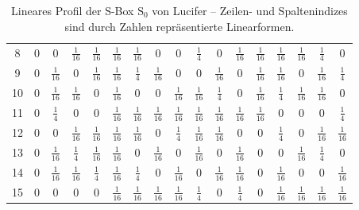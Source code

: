 \begin{refsegment}
\begin{table}
\begin{center}
\begin{tabular}{|c|cccccccccccccccc|}
 8&0& 0            &$\frac{1}{16}$&$\frac{1}{16}$&$\frac{1}{16}$&$\frac{1}{16}$& 0            & 0            &$\frac{1}{4}$
     & 0            &$\frac{1}{16}$&$\frac{1}{16}$&$\frac{1}{16}$&$\frac{1}{16}$&$\frac{1}{4}$ & 0            \\
 9&0&$\frac{1}{16}$& 0            &$\frac{1}{16}$&$\frac{1}{16}$&$\frac{1}{4}$&$\frac{1}{16}$& 0            & 0
     &$\frac{1}{16}$& 0            &$\frac{1}{16}$&$\frac{1}{16}$& 0            &$\frac{1}{16}$&$\frac{1}{4}$ \\
10&0&$\frac{1}{16}$&$\frac{1}{16}$& 0            &$\frac{1}{16}$& 0            & 0            &$\frac{1}{16}$&$\frac{1}{16}$
     &$\frac{1}{4}$ & 0            &$\frac{1}{16}$&$\frac{1}{4}$ &$\frac{1}{16}$&$\frac{1}{16}$& 0            \\
11&0&$\frac{1}{4}$ & 0            & 0            &$\frac{1}{16}$&$\frac{1}{16}$&$\frac{1}{16}$&$\frac{1}{16}$&$\frac{1}{16}$
     &$\frac{1}{16}$&$\frac{1}{16}$&$\frac{1}{16}$& 0            & 0            & 0            &$\frac{1}{4}$ \\
12&0& 0            &$\frac{1}{16}$&$\frac{1}{16}$&$\frac{1}{16}$&$\frac{1}{16}$& 0            &$\frac{1}{4}$ &$\frac{1}{16}$
     &$\frac{1}{16}$& 0            & 0            &$\frac{1}{4}$ & 0            &$\frac{1}{16}$&$\frac{1}{16}$\\
13&0&$\frac{1}{16}$&$\frac{1}{4}$&$\frac{1}{16}$&$\frac{1}{16}$& 0            &$\frac{1}{16}$& 0            &$\frac{1}{16}$
     & 0            &$\frac{1}{16}$& 0            & 0            &$\frac{1}{16}$&$\frac{1}{4}$ &$0$\\
14&0&$\frac{1}{16}$&$\frac{1}{16}$&$\frac{1}{4}$ &$\frac{1}{16}$&$\frac{1}{4}$ & 0            &$\frac{1}{16}$& 0
     &$\frac{1}{16}$&$\frac{1}{16}$& 0            &$\frac{1}{16}$& 0            & 0            &$\frac{1}{16}$\\
15&0& 0            & 0            & 0            &$\frac{1}{16}$&$\frac{1}{16}$&$\frac{1}{16}$&$\frac{1}{16}$&$\frac{1}{4}$
     & 0            &$\frac{1}{4}$ & 0            &$\frac{1}{16}$&$\frac{1}{16}$&$\frac{1}{16}$&$\frac{1}{16}$\\
\hline
\end{tabular}
\end{center}\caption{Lineares Profil der S-Box $\mathrm{S}_0$ von {\sc Lucifer} --
   Zeilen- und Spaltenindizes sind durch Zahlen repräsentierte Linearformen.}\label{tab-bool-lp0}
\end{table}


\end{refsegment}
